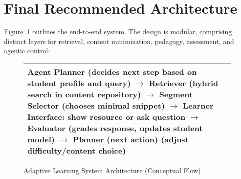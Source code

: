 \documentclass[11pt]{article}
\begin{document}
\section{Final Recommended Architecture}
Figure~\ref{fig:architecture} outlines the end-to-end system. The design is modular, comprising distinct layers for retrieval, content minimization, pedagogy, assessment, and agentic control:
\begin{figure}[h!]
    \centering
    \begin{tabular}{|p{14cm}|}
    \hline
    \textbf{Agent Planner} (decides next step based on student profile and query) $\rightarrow$
    \textbf{Retriever} (hybrid search in content repository) $\rightarrow$
    \textbf{Segment Selector} (chooses minimal snippet) $\rightarrow$
    \textbf{Learner Interface:} show resource or ask question $\rightarrow$
    \textbf{Evaluator} (grades response, updates student model) $\rightarrow$
    \textbf{Planner (next action)} (adjust difficulty/content choice) \\
    \hline
    \end{tabular}
    \caption{Adaptive Learning System Architecture (Conceptual Flow)\label{fig:architecture}}
\end{figure}
\end{document}
